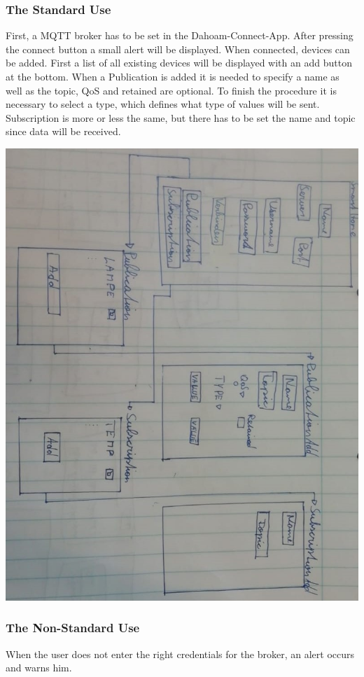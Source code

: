 \documentclass[12pt]{article}
\theoremstyle{definition}
\newenvironment{explanation}{%
   \setlength{\parindent}{0pt}
   \itshape
   \color{blue}
   \normalfont
}{}
\begin{document}
\subsubsection{The Standard Use}
First, a MQTT broker has to be set in the Dahoam-Connect-App. After pressing the connect button a small alert will be displayed. When connected, devices can be added. First a list of all existing devices will be displayed with an add button at the bottom. When a Publication is added it is needed to specify a name as well as the topic, QoS and retained are optional. To finish the procedure it is necessary to select a type, which defines what type of values will be sent. Subscription is more or less the same, but there has to be set the name and topic since data will be received.
\begin{explanation}
\includegraphics[angle=90, scale=.5]{UseCase/InstallSmartHomeInterfaces.jpeg}\\
\end{explanation}

\subsubsection{The Non-Standard Use}
When the user does not enter the right credentials for the broker, an alert occurs and warns him.
\end{document}
